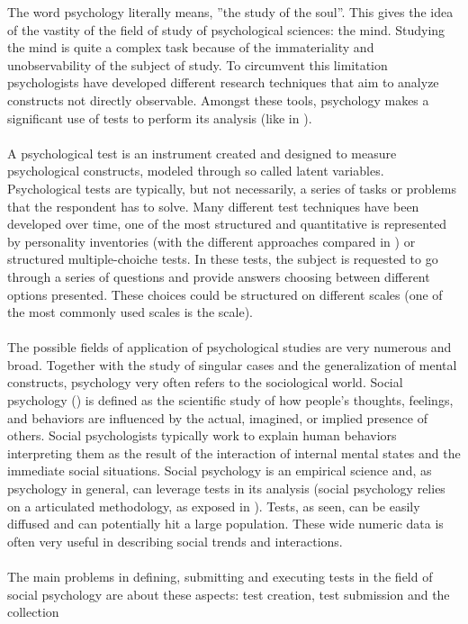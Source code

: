 The word psychology literally means, ”the study of the soul”. This gives the idea of the vastity of the ﬁeld of study of psychological sciences: the mind.
Studying the mind is quite a complex task because of the immateriality and unobservability of the subject of study.
To circumvent this limitation psychologists have developed different research techniques that aim to analyze constructs not directly observable.
Amongst these tools, psychology makes a signiﬁcant use of tests to perform its analysis (like in \cite{Cohen-1992}).\\
\\
A psychological test is an instrument created and designed to measure psychological constructs, modeled through so called latent variables.
Psychological tests are typically, but not necessarily, a series of tasks or problems that the respondent has to solve.
Many different test techniques have been developed over time, one of the most structured and quantitative is represented by personality inventories
(with the different approaches compared in \cite{Burisch-1984}) or structured multiple-choiche tests.
In these tests, the subject is requested to go through a series of questions and provide answers choosing between different options presented.
These choices could be structured on different scales (one of the most commonly used scales is the \cite{Likert-1932} scale).\\
\\
The possible ﬁelds of application of psychological studies are very numerous and broad.
Together with the study of singular cases and the generalization of mental constructs, psychology very often refers to the sociological world.
Social psychology (\cite{Smith-2006}) is deﬁned as the scientiﬁc study of how people’s thoughts, feelings, and behaviors are inﬂuenced by the actual, imagined,
or implied presence of others.
Social psychologists typically work to explain human behaviors interpreting them as the result of the interaction of internal mental states and the immediate
social situations.
Social psychology is an empirical science and, as psychology in general, can leverage tests in its analysis (social psychology relies on a articulated methodology,
as exposed in \cite{Reis-2000}).
Tests, as seen, can be easily diffused and can potentially hit a large population.
These wide numeric data is often very useful in describing social trends and interactions.\\
\\
The main problems in deﬁning, submitting and executing tests in the ﬁeld of social psychology are about these aspects: test creation, test submission and the collection

